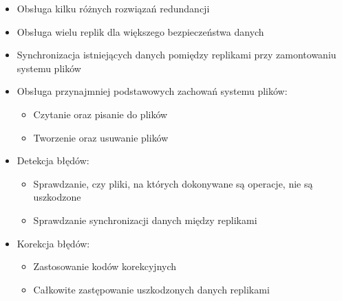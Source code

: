 \begin{itemize}
	\item Obsługa kilku różnych rozwiązań redundancji
    \item Obsługa wielu replik dla większego bezpieczeństwa danych 
	\item Synchronizacja istniejących danych pomiędzy replikami przy zamontowaniu systemu plików
	\item Obsługa przynajmniej podstawowych zachowań systemu plików:
		\begin{itemize}
			\item Czytanie oraz pisanie do plików
			\item Tworzenie oraz usuwanie plików
		\end{itemize}
	\item Detekcja błędów:
		\begin{itemize}
			\item Sprawdzanie, czy pliki, na których dokonywane są operacje, nie są uszkodzone
			\item Sprawdzanie synchronizacji danych między replikami
		\end{itemize}
	\item Korekcja błędów:
		\begin{itemize}
			\item Zastosowanie kodów korekcyjnych
			\item Całkowite zastępowanie uszkodzonych danych replikami
		\end{itemize}
\end{itemize}


